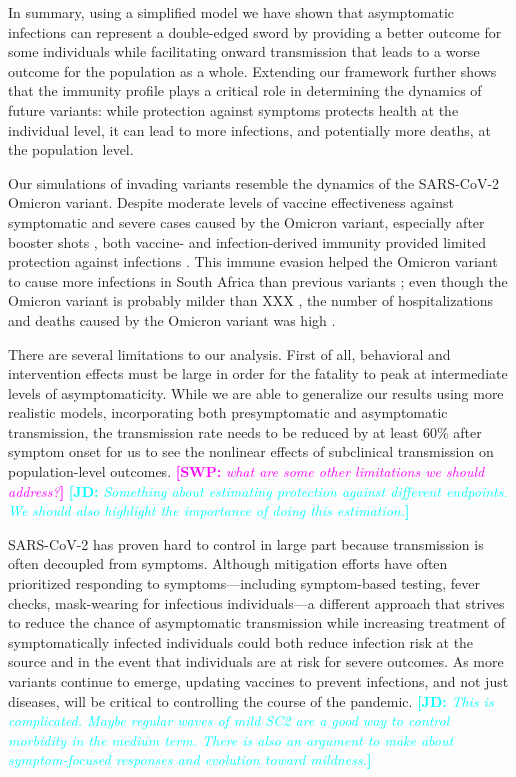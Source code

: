 \documentclass[12pt]{article}
\newcommand{\comment}{\showcomment}
\newcommand{\showcomment}[3]{\textcolor{#1}{\textbf{[#2: }\textsl{#3}\textbf{]}}}
\newcommand{\jd}[1]{\comment{cyan}{JD}{#1}}
\newcommand{\swp}[1]{\comment{magenta}{SWP}{#1}}
\begin{document}
In summary, using a simplified model we have shown that asymptomatic infections can represent a double-edged sword by providing a better outcome for some individuals while facilitating onward transmission that leads to a worse outcome for the population as a whole.
Extending our framework further shows that the immunity profile plays a critical role in determining the dynamics of future variants:
while protection against symptoms protects health at the individual level, it can lead to more infections, and potentially more deaths, at the population level.

Our simulations of invading variants resemble the dynamics of the SARS-CoV-2 Omicron variant.
Despite moderate levels of vaccine effectiveness against symptomatic and severe cases caused by the Omicron variant, especially after booster shots \citep{andres2022omicron}, both vaccine- and infection-derived immunity provided limited protection against infections \citep{pearson2021omicron}.
This immune evasion helped the Omicron variant to cause more infections in South Africa than previous variants \citep{sun2022omicron};
even though the Omicron variant is probably milder than XXX \citep{MENNI20221618,ulloa2022estimates}, the number of hospitalizations and deaths caused by the Omicron variant was high \citep{Iacobuccio254,faust2022omicron,sigal2022estimating}.

There are several limitations to our analysis.
First of all, behavioral and intervention effects must be large in order for the fatality to peak at intermediate levels of asymptomaticity.
While we are able to generalize our results using more realistic models, incorporating both presymptomatic and asymptomatic transmission, the transmission rate needs to be reduced by at least 60\% after symptom onset for us to see the nonlinear effects of subclinical transmission on population-level outcomes.
\swp{what are some other limitations we should address?}
\jd{Something about estimating protection against different endpoints. We should also highlight the importance of doing this estimation.}

SARS-CoV-2 has proven hard to control in large part because transmission is often decoupled from symptoms. 
Although mitigation efforts have often prioritized responding to symptoms---including symptom-based testing, fever checks, mask-wearing for infectious individuals---a different approach that strives to reduce the chance of asymptomatic transmission while increasing treatment of symptomatically infected individuals could both reduce infection risk at the source and in the event that individuals are at risk for severe outcomes.
As more variants continue to emerge, updating vaccines to prevent infections, and not just diseases, will be critical to controlling the course of the pandemic.
\jd{This is complicated. Maybe regular waves of mild SC2 are a good way to control morbidity in the medium term. There is also an argument to make about symptom-focused responses and evolution toward mildness.}
\end{document}
